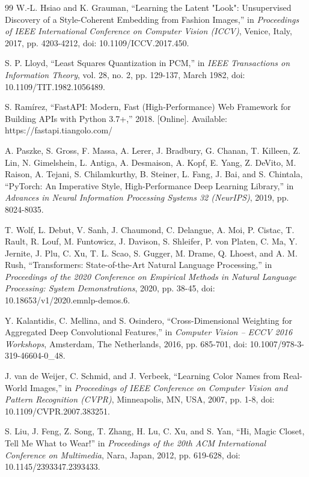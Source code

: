 \documentclass[12pt,a4paper]{report}
\begin{document}
\begin{thebibliography}{99}
W.-L. Hsiao and K. Grauman, ``Learning the Latent "Look": Unsupervised Discovery of a Style-Coherent Embedding from Fashion Images,'' in \textit{Proceedings of IEEE International Conference on Computer Vision (ICCV)}, Venice, Italy, 2017, pp. 4203-4212, doi: 10.1109/ICCV.2017.450.

S. P. Lloyd, ``Least Squares Quantization in PCM,'' in \textit{IEEE Transactions on Information Theory}, vol. 28, no. 2, pp. 129-137, March 1982, doi: 10.1109/TIT.1982.1056489.

S. Ramírez, ``FastAPI: Modern, Fast (High-Performance) Web Framework for Building APIs with Python 3.7+,'' 2018. [Online]. Available: https://fastapi.tiangolo.com/

A. Paszke, S. Gross, F. Massa, A. Lerer, J. Bradbury, G. Chanan, T. Killeen, Z. Lin, N. Gimelshein, L. Antiga, A. Desmaison, A. Kopf, E. Yang, Z. DeVito, M. Raison, A. Tejani, S. Chilamkurthy, B. Steiner, L. Fang, J. Bai, and S. Chintala, ``PyTorch: An Imperative Style, High-Performance Deep Learning Library,'' in \textit{Advances in Neural Information Processing Systems 32 (NeurIPS)}, 2019, pp. 8024-8035.

T. Wolf, L. Debut, V. Sanh, J. Chaumond, C. Delangue, A. Moi, P. Cistac, T. Rault, R. Louf, M. Funtowicz, J. Davison, S. Shleifer, P. von Platen, C. Ma, Y. Jernite, J. Plu, C. Xu, T. L. Scao, S. Gugger, M. Drame, Q. Lhoest, and A. M. Rush, ``Transformers: State-of-the-Art Natural Language Processing,'' in \textit{Proceedings of the 2020 Conference on Empirical Methods in Natural Language Processing: System Demonstrations}, 2020, pp. 38-45, doi: 10.18653/v1/2020.emnlp-demos.6.

Y. Kalantidis, C. Mellina, and S. Osindero, ``Cross-Dimensional Weighting for Aggregated Deep Convolutional Features,'' in \textit{Computer Vision -- ECCV 2016 Workshops}, Amsterdam, The Netherlands, 2016, pp. 685-701, doi: 10.1007/978-3-319-46604-0\_48.

J. van de Weijer, C. Schmid, and J. Verbeek, ``Learning Color Names from Real-World Images,'' in \textit{Proceedings of IEEE Conference on Computer Vision and Pattern Recognition (CVPR)}, Minneapolis, MN, USA, 2007, pp. 1-8, doi: 10.1109/CVPR.2007.383251.

S. Liu, J. Feng, Z. Song, T. Zhang, H. Lu, C. Xu, and S. Yan, ``Hi, Magic Closet, Tell Me What to Wear!'' in \textit{Proceedings of the 20th ACM International Conference on Multimedia}, Nara, Japan, 2012, pp. 619-628, doi: 10.1145/2393347.2393433.


\end{thebibliography}
\end{document}
